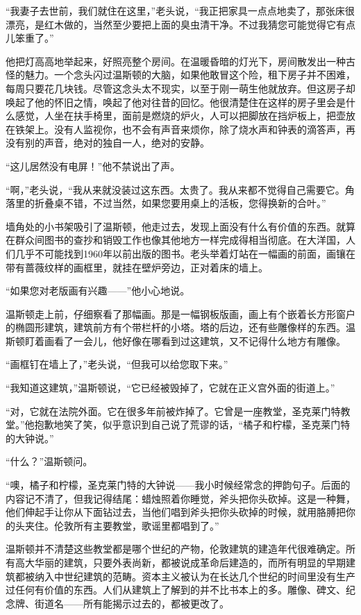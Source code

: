 ``我妻子去世前，我们就住在这里，''老头说，``我正把家具一点点地卖了，那张床很漂亮，是红木做的，当然至少要把上面的臭虫清干净。不过我猜您可能觉得它有点儿笨重了。''

他把灯高高地举起来，好照亮整个房间。在温暖昏暗的灯光下，房间散发出一种古怪的魅力。一个念头闪过温斯顿的大脑，如果他敢冒这个险，租下房子并不困难，每周只要花几块钱。尽管这念头太不现实，以至于刚一萌生他就放弃。但这房子却唤起了他的怀旧之情，唤起了他对往昔的回忆。他很清楚住在这样的房子里会是什么感觉，人坐在扶手椅里，面前是燃烧的炉火，人可以把脚放在挡炉板上，把壶放在铁架上。没有人监视你，也不会有声音来烦你，除了烧水声和钟表的滴答声，再没有别的声音，绝对的独自一人，绝对的安静。

``这儿居然没有电屏！''他不禁说出了声。

``啊，''老头说，``我从来就没装过这东西。太贵了。我从来都不觉得自己需要它。角落里的折叠桌不错，不过当然，如果您要用桌上的活板，您得换新的合叶。''

墙角处的小书架吸引了温斯顿，他走过去，发现上面没有什么有价值的东西。就算在群众间图书的查抄和销毁工作也像其他地方一样完成得相当彻底。在大洋国，人们几乎不可能找到1960年以前出版的图书。老头举着灯站在一幅画的前面，画镶在带有蔷薇纹样的画框里，就挂在壁炉旁边，正对着床的墙上。

``如果您对老版画有兴趣------''他小心地说。

温斯顿走上前，仔细察看了那幅画。那是一幅钢板版画，画上有个嵌着长方形窗户的椭圆形建筑，建筑前方有个带栏杆的小塔。塔的后边，还有些雕像样的东西。温斯顿盯着画看了一会儿，他好像在哪看到过这建筑，又不记得什么地方有雕像。

``画框钉在墙上了，''老头说，``但我可以给您取下来。''

``我知道这建筑，''温斯顿说，``它已经被毁掉了，它就在正义宫外面的街道上。''

``对，它就在法院外面。它在很多年前被炸掉了。它曾是一座教堂，圣克莱门特教堂。''他抱歉地笑了笑，似乎意识到自己说了荒谬的话，``橘子和柠檬，圣克莱门特的大钟说。''

``什么？''温斯顿问。

``噢，橘子和柠檬，圣克莱门特的大钟说------我小时候经常念的押韵句子。后面的内容记不清了，但我记得结尾：蜡烛照着你睡觉，斧头把你头砍掉。这是一种舞，他们伸起手让你从下面钻过去，当他们唱到斧头把你头砍掉的时候，就用胳膊把你的头夹住。伦敦所有主要教堂，歌谣里都唱到了。''

温斯顿并不清楚这些教堂都是哪个世纪的产物，伦敦建筑的建造年代很难确定。所有高大华丽的建筑，只要外表尚新，都被说成革命后建造的，而所有明显的早期建筑都被纳入中世纪建筑的范畴。资本主义被认为在长达几个世纪的时间里没有生产过任何有价值的东西。人们从建筑上了解到的并不比书本上的多。雕像、碑文、纪念牌、街道名------所有能揭示过去的，都被更改了。

